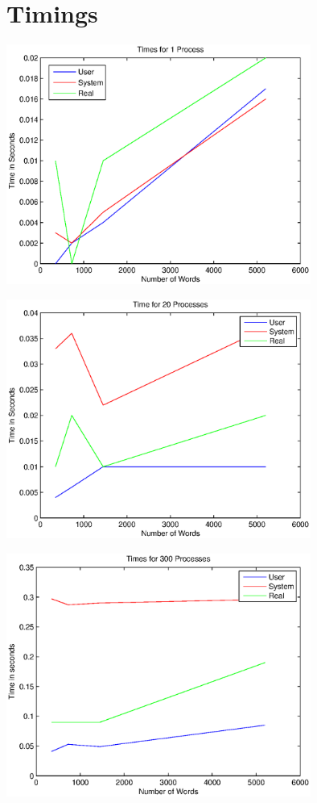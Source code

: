 \documentclass[letterpaper,10pt,notitlepage,fleqn]{article}
\begin{document}
\section*{Timings}
\centerline{\includegraphics[width=0.75\textwidth]{process_1.eps}}
\centerline{\includegraphics[width=0.75\textwidth]{process_20.eps}}
\centerline{\includegraphics[width=0.75\textwidth]{process_300.eps}}
\end{document}
